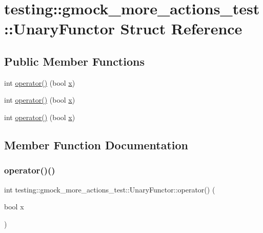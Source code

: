 \hypertarget{structtesting_1_1gmock__more__actions__test_1_1_unary_functor}{}\section{testing\+::gmock\+\_\+more\+\_\+actions\+\_\+test\+::Unary\+Functor Struct Reference}
\label{structtesting_1_1gmock__more__actions__test_1_1_unary_functor}
\subsection*{Public Member Functions}
\begin{DoxyCompactItemize}
\item 
int \mbox{\hyperlink{structtesting_1_1gmock__more__actions__test_1_1_unary_functor_a3c33592b266e8ed2c7980df9868db53a}{operator()}} (bool \mbox{\hyperlink{_obj__test_2lib_2googletest-master_2googlemock_2test_2gmock-matchers__test_8cc_a6150e0515f7202e2fb518f7206ed97dc}{x}})
\item 
int \mbox{\hyperlink{structtesting_1_1gmock__more__actions__test_1_1_unary_functor_a3c33592b266e8ed2c7980df9868db53a}{operator()}} (bool \mbox{\hyperlink{_obj__test_2lib_2googletest-master_2googlemock_2test_2gmock-matchers__test_8cc_a6150e0515f7202e2fb518f7206ed97dc}{x}})
\item 
int \mbox{\hyperlink{structtesting_1_1gmock__more__actions__test_1_1_unary_functor_a3c33592b266e8ed2c7980df9868db53a}{operator()}} (bool \mbox{\hyperlink{_obj__test_2lib_2googletest-master_2googlemock_2test_2gmock-matchers__test_8cc_a6150e0515f7202e2fb518f7206ed97dc}{x}})
\end{DoxyCompactItemize}


\subsection{Member Function Documentation}
\mbox{\label{structtesting_1_1gmock__more__actions__test_1_1_unary_functor_a3c33592b266e8ed2c7980df9868db53a}} 
\subsubsection{\texorpdfstring{operator()()}{operator()()}\hspace{0.1cm}{\footnotesize\ttfamily [1/3]}}
{\footnotesize\ttfamily int testing\+::gmock\+\_\+more\+\_\+actions\+\_\+test\+::\+Unary\+Functor\+::operator() (\begin{DoxyParamCaption}\item[{bool}]{x }\end{DoxyParamCaption})\hspace{0.3cm}{\ttfamily [inline]}}

